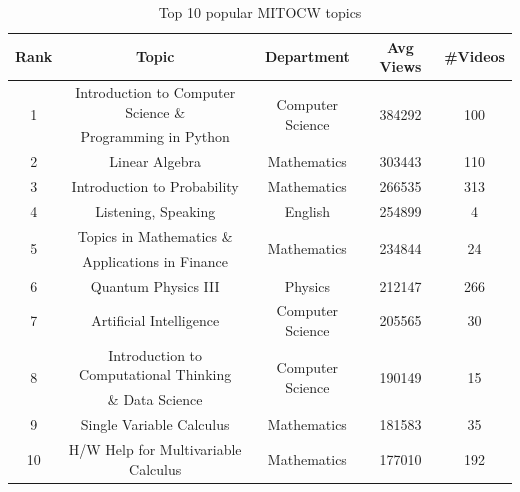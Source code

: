 \documentclass{article}
\begin{document}
\begin{table}[!htpb]
    \centering
    \begin{tabular}{|c|c|c|c|c|}
    \hline
        \textbf{Rank} & \textbf{Topic} & \textbf{Department} & \textbf{Avg Views} & 
        \textbf{\#Videos}\\
    \hline
        \multirow{2}{*}{1} & Introduction to Computer Science \& & \multirow{2}{*}{Computer Science} & \multirow{2}{*}{384292} & \multirow{2}{*}{100}\\
        & Programming in Python & & &\\
        2 & Linear Algebra & Mathematics & 303443 & 110\\
        3 & Introduction to Probability & Mathematics & 266535 & 313\\
        4 & Listening, Speaking & English & 254899 & 4\\
        \multirow{2}{*}{5} & Topics in Mathematics \& & \multirow{2}{*}{Mathematics} & \multirow{2}{*}{234844} & \multirow{2}{*}{24}\\
        & Applications in Finance & & &\\
        6 & Quantum Physics III & Physics & 212147 & 266\\
        7 & Artificial Intelligence & Computer Science & 205565 & 30\\
        \multirow{2}{*}{8} & Introduction to Computational Thinking & \multirow{2}{*}{Computer Science} & \multirow{2}{*}{190149} & \multirow{2}{*}{15}\\
        & \& Data Science & & &\\
        9 & Single Variable Calculus & Mathematics & 181583 & 35\\
        10 & H/W Help for Multivariable Calculus & Mathematics & 177010 & 192\\
        
    \hline
    \end{tabular}\vspace{3mm}
    \caption{Top 10 popular MITOCW topics}
    \label{tab:my_label}
\end{table}
\Floatbarrier
\end{document}
